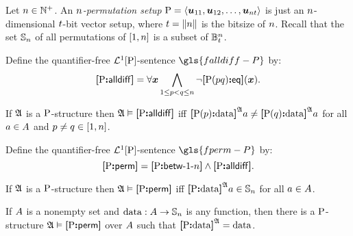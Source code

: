 Let $\nn \in \pNats$. An \emph{$\nn$-permutation setup} 
$\PS = \seq{\suu{11}, \suu{12}, \dots, \suu{\nn\tbit}}$ is just an
$\nn$-dimensional $\tbit$-bit vector setup, where $\tbit = \bsz{\nn}$ is the
bitsize of $\nn$.
Recall that the set $\Perms\nn$ of all permutations of $[1, \nn]$ is a subset
of $\ntBitnums\nn\tbit$.

\begin{definition}
Define the quantifier-free $\vFoF1\PS$-sentence $\gls{falldiff-P}$ by:
\[
  \falldiff\PS = \forall\xx \bigwedge_{1 \leq \posp < \posq \leq \nn}
  \lnot\feqP\PS\posp\posq(\xx).
\]
\end{definition}
\begin{remark}
If $\StrA$ is a $\PS$-structure then $\StrA \vDash \falldiff\PS$ iff
$\data{\PSp\posp}\StrA\ea \neq \data{\PSp\posq}\StrA\ea$
for all $\ea \in \domA$ and $\posp \neq \posq \in [1, \nn]$.
\end{remark}

\begin{definition}
Define the quantifier-free $\vFoF1\PS$-sentence $\gls{fperm-P}$ by:
\[
  \fperm\PS = \fbetw\PS1\nn \land \falldiff\PS.
\]
\end{definition}
\begin{remark}
If $\StrA$ is a $\PS$-structure then $\StrA \vDash \fperm\PS$ iff
$\data\PS\StrA\ea \in \Perms\nn$ for all $\ea \in \domA$.

If $\domA$ is a nonempty set and $\dataOP : \domA \to \Perms\nn$ is any
function, then there is a $\PS$-structure $\StrA \vDash \fperm\PS$ over $\domA$
such that $\data\PS\StrA = \dataOP$.
\end{remark}